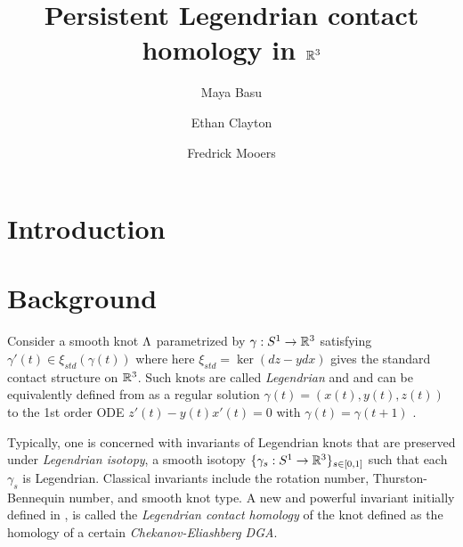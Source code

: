 \documentclass[11pt]{amsart}
\begin{document}
\author{Maya Basu}
\author{Ethan Clayton}
\author{Fredrick Mooers}

\address{University of California, Berkeley}

\address{University of Illinois, Urbana-Champaign}

\address{Virginia Tech}

\title{Persistent Legendrian contact homology in $\mathbb R^3$}

\begin{abstract}
\lipsum[2]
\end{abstract}


\maketitle

\tableofcontents
\newpage

\section{Introduction}

\lipsum[30]

\section{Background}

Consider a smooth knot $\Lambda$ parametrized by $\gamma:S^1\rightarrow \mathbb R^3$ satisfying $\gamma'(t)\in \xi_{std}(\gamma(t))$ where here $\xi_{std}=\ker(dz-ydx)$ gives the standard contact structure on $\mathbb R^3$. Such knots are called \textit{Legendrian} and and can be equivalently defined from as a regular solution $\gamma(t)=(x(t),y(t),z(t))$ to the 1st order ODE $z'(t)-y(t)x'(t)=0$ with $\gamma(t)=\gamma(t+1)$ \cite{EN23lch}.

Typically, one is concerned with invariants of Legendrian knots that are preserved under \textit{Legendrian isotopy}, a smooth isotopy $\{\gamma_s:S^1\rightarrow \mathbb R^3\}_{s\in [0,1]}$ such that each $\gamma_s$ is Legendrian. Classical invariants include the rotation number, Thurston-Bennequin number, and smooth knot type. A new and powerful invariant initially defined in \cite{CH03inv}, is called the \textit{Legendrian contact homology} of the knot defined as the homology of a certain \textit{Chekanov-Eliashberg DGA}.
\end{document}
